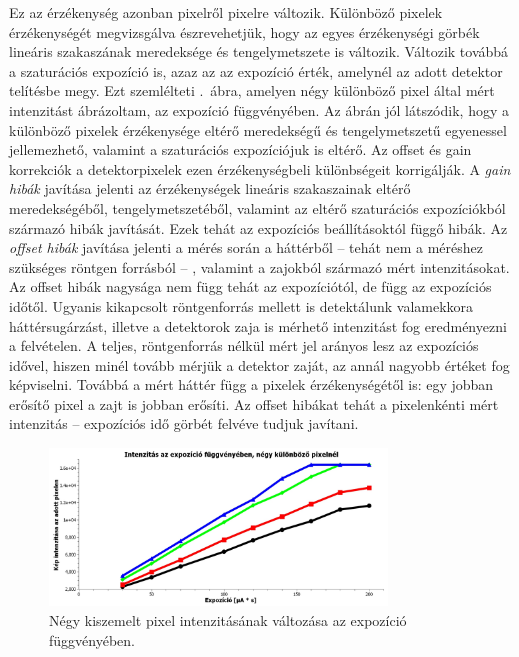 \documentclass[a4paper,12pt,twoside]{article}
\begin{document}
Ez az érzékenység azonban pixelről pixelre változik. Különböző pixelek érzékenységét megvizsgálva észrevehetjük, hogy az egyes érzékenységi görbék lineáris szakaszának meredeksége és tengelymetszete is változik. Változik továbbá a szaturációs expozíció is, azaz az az expozíció érték, amelynél az adott detektor telítésbe megy. Ezt szemlélteti .~ábra, amelyen négy különböző pixel által mért intenzitást ábrázoltam, az expozíció függvényében. Az ábrán jól látszódik, hogy a különböző pixelek érzékenysége eltérő meredekségű és tengelymetszetű egyenessel jellemezhető, valamint a szaturációs expozíciójuk is eltérő. Az offset és gain korrekciók a detektorpixelek ezen érzékenységbeli különbségeit korrigálják. A \emph{gain hibák} javítása jelenti az érzékenységek lineáris szakaszainak eltérő meredekségéből, tengelymetszetéből, valamint az eltérő szaturációs expozíciókból származó hibák javítását. Ezek tehát az expozíciós beállításoktól függő hibák.
Az \emph{offset hibák} javítása jelenti a mérés során a háttérből -- tehát nem a méréshez szükséges röntgen forrásból -- , valamint a zajokból származó mért intenzitásokat.  Az offset  hibák nagysága nem függ tehát az expozíciótól, de függ az expozíciós időtől. Ugyanis kikapcsolt röntgenforrás mellett is detektálunk valamekkora háttérsugárzást, illetve a detektorok zaja is mérhető intenzitást fog eredményezni a felvételen. A teljes, röntgenforrás nélkül mért jel arányos lesz az expozíciós idővel, hiszen minél tovább mérjük a detektor zaját, az annál nagyobb értéket fog képviselni. Továbbá a mért háttér függ a pixelek érzékenységétől is: egy jobban erősítő pixel a zajt is jobban erősíti. Az offset hibákat  tehát a pixelenkénti mért intenzitás -- expozíciós idő görbét felvéve tudjuk javítani.





\begin{figure}[htbp]
\center
\includegraphics[width=0.8\textwidth]{abrak/gaingrafikon}
\caption{Négy kiszemelt pixel intenzitásának változása az expozíció függvényében.}
\label{fig:gaingrafikon}
\end{figure}
\end{document}
